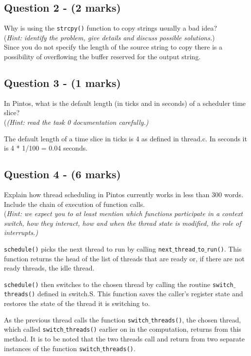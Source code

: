 \documentclass[a4paper,12pt]{article}
\begin{document}
\subsection*{Question 2 - (2 marks)}
Why is using the \texttt{strcpy()} function to copy strings usually a bad idea? \\
(\textit{Hint: identify the problem, give details and discuss possible solutions.})\\

Since you do not specify the length of the source string to copy there is a possibility of overflowing the buffer reserved for the output string.\\

\subsection*{Question 3 - (1 marks)}
In Pintos, what is the default length (in ticks and in seconds) of a scheduler time slice? \\
(\textit{(Hint: read the task 0 documentation carefully.)}

The default length of a time slice in ticks is 4 as defined in thread.c. In seconds it is 4 * 1/100 = 0.04 seconds.\\

\subsection*{Question 4 - (6 marks)}
Explain how thread scheduling in Pintos currently works in less than 300 words.
Include the chain of execution of function calls. \\
(\textit{Hint: we expect you to at least mention which functions participate in a context switch, how they interact, how and when the thread state is modified, the role of interrupts.)}

\texttt{schedule()} picks the next thread to run by calling \texttt{next$\_$thread$\_$to$\_$run()}. This function returns the head of the list of threads that are ready or, if there are not ready threads, the idle thread.

\texttt{schedule()}  then switches to the chosen thread by calling the routine \texttt{switch$\_$threads()} defined in switch.S. This function saves the caller’s register state and restores the state of the thread it is switching to.

As the previous thread calls the function \texttt{switch$\_$threads()}, the chosen thread, which called \texttt{switch$\_$threads()} earlier on in the computation, returns from this method. It is to be noted that the two threads call and return from two separate instances of the function \texttt{switch$\_$threads()}.
\end{document}
